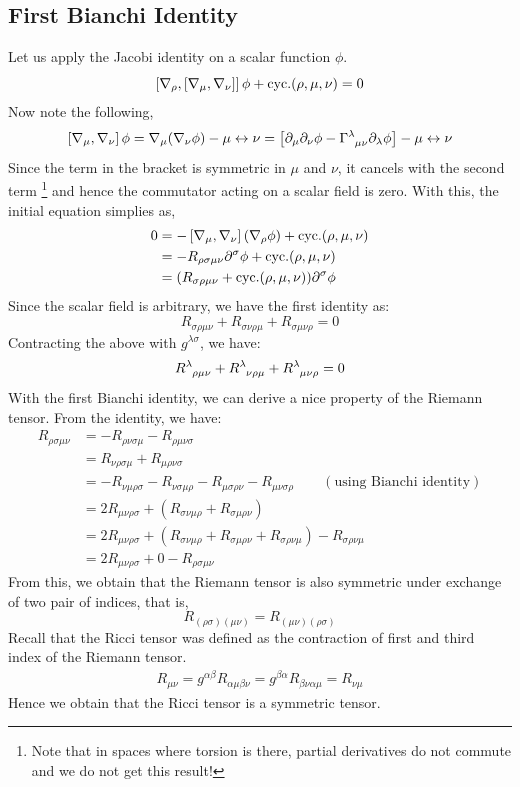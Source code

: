 \subsection{First Bianchi Identity}
Let us apply the Jacobi identity on a scalar function $\phi$. 
$$\left[ \nabla_{\rho}, \left[ \nabla_{\mu}, \nabla_{\nu} \right] \right]\phi + \mathrm{cyc}. (\rho, \mu,\nu)= 0$$
Now note the following,
$$\comtr{\covd{\mu}}{\covd{\nu}}\phi = \covd{\mu}(\covd{\nu}\phi) - \mu \leftrightarrow \nu = \qty[\partial_\mu \partial_\nu\phi - \chris{\lambda}{\mu}{\nu}\partial_{\lambda}\phi] - \mu \leftrightarrow \nu$$
Since the term in the bracket is symmetric in $\mu$ and $\nu$, it cancels with the second term \footnote{Note that in spaces where torsion is there, partial derivatives do not commute and we do not get this result!} and hence the commutator acting on a scalar field is zero. With this, the initial equation simplies as,
\begin{align*}
    0 &= -\left[ \nabla_{\mu}, \nabla_{\nu} \right](\nabla_{\rho}\phi) +\mathrm{cyc}. (\rho, \mu,\nu)\\
    &=-R_{\rho\sigma\mu\nu}\partial^\sigma\phi + \mathrm{cyc}. (\rho, \mu,\nu)\\
    &=(R_{\sigma\rho\mu\nu}+ \mathrm{cyc}. (\rho, \mu,\nu))\partial^\sigma \phi 
\end{align*}
Since the scalar field is arbitrary, we have the first identity as:
$$R_{\sigma\rho\mu\nu} + R_{\sigma\nu\rho\mu}+R_{\sigma\mu\nu\rho}=0$$
Contracting the above with $g^{\lambda\sigma}$, we have:
$$\rie{\lambda}{\rho}{\mu}{\nu} + \rie{\lambda}{\nu}{\rho}{\mu}+\rie{\lambda}{\mu}{\nu}{\rho}=0$$
With the first Bianchi identity, we can derive a nice property of the Riemann tensor. From the identity, we have:
\begin{align*}
    R_{\rho\sigma\mu\nu} &= -R_{\rho\nu\sigma\mu}-R_{\rho\mu\nu\sigma} \\
    &=R_{\nu\rho\sigma\mu}+R_{\mu\rho\nu\sigma}\\
    &=-R_{\nu\mu\rho\sigma}-R_{\nu\sigma\mu\rho}-R_{\mu\sigma\rho\nu}-R_{\mu\nu\sigma\rho}\qquad (\text{using Bianchi identity})\\
    &=2R_{\mu\nu\rho\sigma} +(R_{\sigma\nu\mu\rho} +R_{\sigma\mu\rho\nu})\\
    &=2R_{\mu\nu\rho\sigma} +(R_{\sigma\nu\mu\rho} +R_{\sigma\mu\rho\nu} + R_{\sigma\rho\nu\mu}) -R_{\sigma\rho\nu\mu}\\
    &=2R_{\mu\nu\rho\sigma} +  0 - R_{\rho\sigma\mu\nu}
\end{align*}
From this, we obtain that the Riemann tensor is also symmetric under exchange of two pair of indices, that is,
$$R_{(\rho\sigma)(\mu\nu)} = R_{(\mu\nu)(\rho\sigma)}$$
Recall that the Ricci tensor was defined as the contraction of first and third index of the Riemann tensor.
\begin{align*}
    R_{\mu\nu} = g^{\alpha\beta}R_{\alpha \mu \beta \nu}=g^{\beta\alpha}R_{ \beta \nu\alpha \mu}=R_{\nu\mu}
\end{align*}
Hence we obtain that the Ricci tensor is a symmetric tensor.

